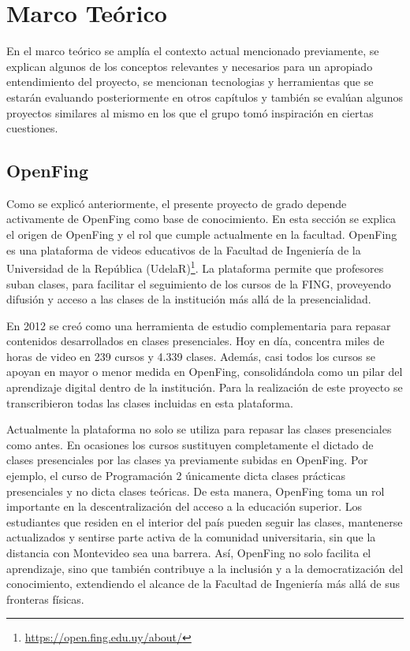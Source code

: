 \chapter{Marco Teórico}
\label{chapter:2-Marco Teórico} 

En el marco teórico se amplía el contexto actual mencionado previamente, se explican algunos de los conceptos relevantes y necesarios para un apropiado entendimiento del proyecto, se mencionan tecnologias y herramientas que se estarán evaluando posteriormente en otros capítulos y también se evalúan algunos proyectos similares al mismo en los que el grupo tomó inspiración en ciertas cuestiones. 

\section[OpenFing]{OpenFing}
\label{section:2-OpenFing}
Como se explicó anteriormente, el presente proyecto de grado depende activamente de OpenFing como base de conocimiento. En esta sección se explica el origen de OpenFing y el rol que cumple actualmente en la facultad.
OpenFing es una plataforma de videos educativos de la Facultad de Ingeniería de la Universidad de la República (UdelaR)\footnote{\url{https://open.fing.edu.uy/about/}}. La plataforma permite que profesores suban clases, para facilitar el seguimiento de los cursos de la FING, proveyendo difusión y acceso a las clases de la institución más allá de la presencialidad.

En 2012 se creó como una herramienta de estudio complementaria para repasar contenidos desarrollados en clases presenciales. Hoy en día, concentra miles de horas de video en 239 cursos y 4.339 clases. Además, casi todos los cursos se apoyan en mayor o menor medida en OpenFing, consolidándola como un pilar del aprendizaje digital dentro de la institución. Para la realización de este proyecto se transcribieron todas las clases incluidas en esta plataforma.

Actualmente la plataforma no solo se utiliza para repasar las clases presenciales como antes. En ocasiones los cursos sustituyen completamente el dictado de clases presenciales por las clases ya previamente subidas en OpenFing. Por ejemplo, el curso de Programación 2 únicamente dicta clases prácticas presenciales y no dicta clases teóricas. De esta manera, OpenFing toma un rol importante en la descentralización del acceso a la educación superior. Los estudiantes que residen en el interior del país pueden seguir las clases, mantenerse actualizados y sentirse parte activa de la comunidad universitaria, sin que la distancia con Montevideo sea una barrera. Así, OpenFing no solo facilita el aprendizaje, sino que también contribuye a la inclusión y a la democratización del conocimiento, extendiendo el alcance de la Facultad de Ingeniería más allá de sus fronteras físicas.

